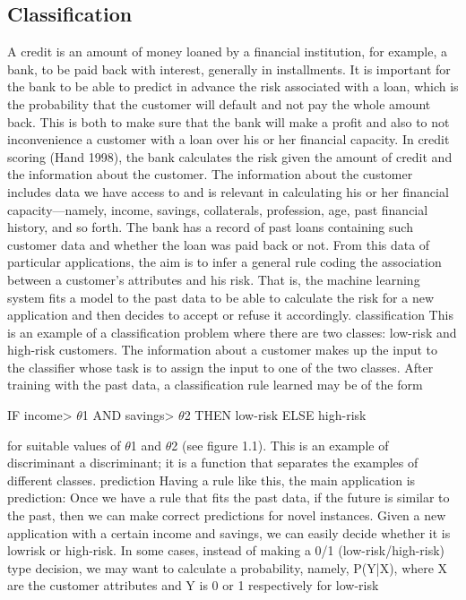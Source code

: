\subsection{Classification}

A credit is an amount of money loaned by a financial institution, for example, a bank, to be paid back with interest, generally in installments. It is important for the bank to be able to predict in advance the risk associated with a loan, which is the probability that the customer will default and not pay the whole amount back. This is both to make sure that the bank will make a profit and also to not inconvenience a customer with a loan over his or her financial capacity. In credit scoring (Hand 1998), the bank calculates the risk given the amount of credit and the information about the customer. The information about the customer includes data we have access to and is relevant in calculating his or her financial capacity---namely, income, savings, collaterals, profession, age, past financial history, and so forth. The bank has a record of past loans containing such customer data and whether the loan was paid back or not. From this data of particular applications, the aim is to infer a general rule coding the association between a customer’s attributes and his risk. That is, the machine learning system fits a model to the past data to be able to calculate the risk for a new application and then decides to accept or refuse it accordingly. classification This is an example of a classification problem where there are two classes: low-risk and high-risk customers. The information about a customer makes up the input to the classifier whose task is to assign the input to one of the two classes. After training with the past data, a classification rule learned may be of the form

IF income> $\theta$1 AND savings> $\theta$2 THEN low-risk ELSE high-risk

for suitable values of $\theta$1 and $\theta$2 (see figure 1.1). This is an example of discriminant a discriminant; it is a function that separates the examples of different classes. prediction Having a rule like this, the main application is prediction: Once we have a rule that fits the past data, if the future is similar to the past, then we can make correct predictions for novel instances. Given a new application with a certain income and savings, we can easily decide whether it is lowrisk or high-risk. In some cases, instead of making a 0/1 (low-risk/high-risk) type decision, we may want to calculate a probability, namely, P(Y|X), where X are the customer attributes and Y is 0 or 1 respectively for low-risk

